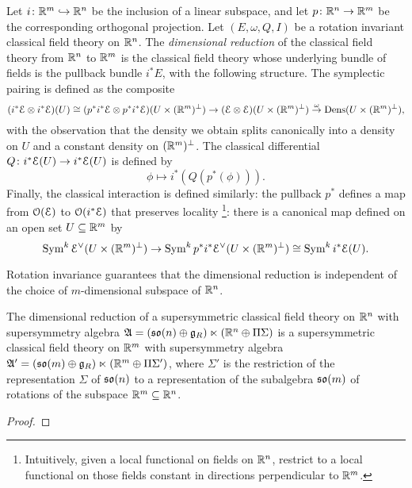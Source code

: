 \documentclass[10pt, oneside]{article}
\begin{document}
\begin{definition}
Let $i\colon \mathbb R^m \hookrightarrow \mathbb R^n$ be the inclusion of a linear subspace, and let $p \colon \mathbb R^n \to \mathbb R^m$ be the corresponding orthogonal projection. Let $(E, \omega, Q, I)$ be a rotation invariant classical field theory on $\mathbb R^n$.  The \emph{dimensional reduction} of the classical field theory from $\mathbb R^n$ to $\mathbb R^m$ is the classical field theory whose underlying bundle of fields is the pullback bundle $i^*E$, with the following structure.  The symplectic pairing is defined as the composite
\[(i^*\mathcal{E} \otimes i^*\mathcal{E})(U) \cong (p^*i^*\mathcal{E} \otimes p^*i^*\mathcal{E})(U \times (\mathbb R^m)^\perp) \to (\mathcal{E} \otimes \mathcal{E})(U \times (\mathbb R^m)^\perp) \overset \omega \to \operatorname{Dens}(U \times (\mathbb R^m)^\perp),\]
with the observation that the density we obtain splits canonically into a density on $U$ and a constant density on $(\mathbb R^m)^\perp$.  The classical differential $Q \colon i^*\mathcal{E}(U) \to i^*\mathcal{E}(U)$ is defined by
\[\phi \mapsto i^*(Q(p^*(\phi))).\]
Finally, the classical interaction is defined similarly: the pullback $p^*$ defines a map from $\mathcal{O}(\mathcal{E})$ to $\mathcal{O}(i^*\mathcal{E})$ that preserves locality \footnote{Intuitively, given a local functional on fields on $\mathbb R^n$, restrict to a local functional on those fields constant in directions perpendicular to $\mathbb R^m$.}: there is a canonical map defined on an open set $U \subseteq \mathbb R^m$ by
\[\operatorname{Sym}^k \mathcal{E}^\vee(U\times (\mathbb R^m)^\perp) \to \operatorname{Sym}^k p^*i^*\mathcal{E}^\vee(U\times (\mathbb R^m)^\perp) \cong \operatorname{Sym}^k i^*\mathcal{E}(U).\]
\end{definition}

Rotation invariance guarantees that the dimensional reduction is independent of the choice of $m$-dimensional subspace of $\mathbb R^n$.

\begin{prop} \label{dim_red_SUSY_prop}
The dimensional reduction of a supersymmetric classical field theory on $\mathbb R^n$ with supersymmetry algebra $\mathfrak{A} = (\mathfrak{so}(n) \oplus \mathfrak{g}_R) \ltimes (\mathbb R^n \oplus \Pi \Sigma)$ is a supersymmetric classical field theory on $\mathbb R^m$ with supersymmetry algebra $\mathfrak{A}' = (\mathfrak{so}(m) \oplus \mathfrak{g}_R) \ltimes (\mathbb R^m \oplus \Pi \Sigma')$, where $\Sigma'$ is the restriction of the representation $\Sigma$ of $\mathfrak{so}(n)$ to a representation of the subalgebra $\mathfrak{so}(m)$ of rotations of the subspace $\mathbb R^m \subseteq \mathbb R^n$.
\end{prop}

\begin{proof}
\end{proof}
\end{document}
